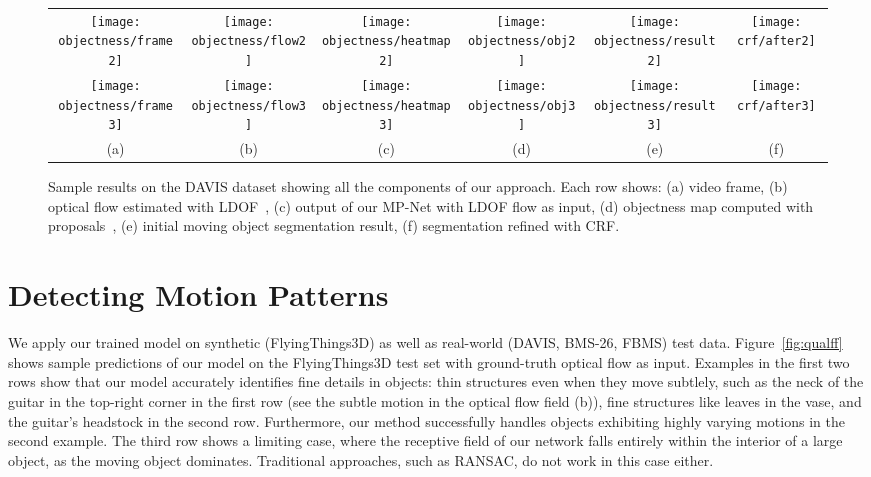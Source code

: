 \documentclass[10pt,twocolumn,letterpaper]{article}
\begin{document}
\setlength{\tabcolsep}{2pt}
\begin{figure*}[t]
\begin{center}
\begin{tabular}{cccccc}
\texttt{[image: objectness/frame2]} & 
\texttt{[image: objectness/flow2]} & 
\texttt{[image: objectness/heatmap2]} & 
\texttt{[image: objectness/obj2]} & 
\texttt{[image: objectness/result2]} & 
\texttt{[image: crf/after2]} \\ 

\texttt{[image: objectness/frame3]} & 
\texttt{[image: objectness/flow3]} & 
\texttt{[image: objectness/heatmap3]} & 
\texttt{[image: objectness/obj3]} & 
\texttt{[image: objectness/result3]} & 
\texttt{[image: crf/after3]} \\ 

(a) & (b) & (c) & (d) & (e) & (f)
\end{tabular}
\end{center}
\vspace{-0.3cm}\caption{Sample results on the DAVIS dataset showing all the
components of our approach. Each row shows: (a) video frame, (b) optical flow
estimated with LDOF~\cite{Brox11a}, (c) output of our MP-Net with LDOF
flow as input, (d) objectness
map computed with proposals~\cite{pinheiro2016learning}, (e) initial moving
object segmentation result, (f) segmentation refined with CRF.\vspace{-0.5cm}}
\label{fig:obj}
\end{figure*}
\setlength{\tabcolsep}{6pt}

\section{Detecting Motion Patterns}
\label{sec:realvid}
\vspace{-0.2cm}
We apply our trained model on synthetic (FlyingThings3D) as well as real-world
(DAVIS, BMS-26, FBMS) test data. Figure~\ref{fig:qualff} shows sample
predictions of our model on the FlyingThings3D test set with ground-truth
optical flow as input. Examples in the first two rows show that our model
accurately identifies fine details in objects: thin structures even when they
move subtlely, such as the neck of the guitar in the top-right corner in the
first row (see the subtle motion in the optical flow field (b)), fine
structures like leaves in the vase, and the guitar's headstock in the second
row.  Furthermore, our method successfully handles objects exhibiting highly
varying motions in the second example. The third row shows a limiting case,
where the receptive field of our network falls entirely within the interior of
a large object, as the moving object dominates. Traditional approaches, such as
RANSAC, do not work in this case either.
\end{document}

